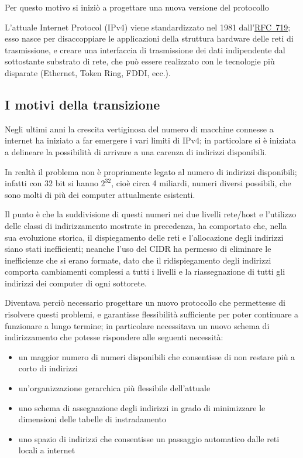 Per questo motivo si iniziò a progettare una nuova versione del protocollo 

L'attuale Internet Protocol (IPv4) viene standardizzato nel 1981
dall'\href{http://www.ietf.org/rfc/rfc719.txt}{RFC~719}; esso nasce per
disaccoppiare le applicazioni della struttura hardware delle reti di
trasmissione, e creare una interfaccia di trasmissione dei dati indipendente
dal sottostante substrato di rete, che può essere realizzato con le tecnologie
più disparate (Ethernet, Token Ring, FDDI, ecc.).


\subsection{I motivi della transizione}
\label{sec:IP_whyipv6}

Negli ultimi anni la crescita vertiginosa del numero di macchine connesse a
internet ha iniziato a far emergere i vari limiti di IPv4; in particolare si
è iniziata a delineare la possibilità di arrivare a una carenza di
indirizzi disponibili.

In realtà il problema non è propriamente legato al numero di indirizzi
disponibili; infatti con 32 bit si hanno $2^{32}$, cioè circa 4 miliardi,
numeri diversi possibili, che sono molti di più dei computer attualmente
esistenti.

Il punto è che la suddivisione di questi numeri nei due livelli rete/host e
l'utilizzo delle classi di indirizzamento mostrate in precedenza, ha
comportato che, nella sua evoluzione storica, il dispiegamento delle reti e
l'allocazione degli indirizzi siano stati inefficienti; neanche l'uso del CIDR
ha permesso di eliminare le inefficienze che si erano formate, dato che il
ridispiegamento degli indirizzi comporta cambiamenti complessi a tutti i
livelli e la riassegnazione di tutti gli indirizzi dei computer di ogni
sottorete.

Diventava perciò necessario progettare un nuovo protocollo che permettesse
di risolvere questi problemi, e garantisse flessibilità sufficiente per
poter continuare a funzionare a lungo termine; in particolare necessitava un
nuovo schema di indirizzamento che potesse rispondere alle seguenti
necessità:

\begin{itemize}
\item un maggior numero di numeri disponibili che consentisse di non restare
  più a corto di indirizzi
\item un'organizzazione gerarchica più flessibile dell'attuale 
\item uno schema di assegnazione degli indirizzi in grado di minimizzare le
  dimensioni delle tabelle di instradamento
\item uno spazio di indirizzi che consentisse un passaggio automatico dalle
  reti locali a internet
\end{itemize}


